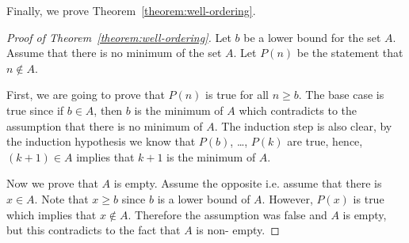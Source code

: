 Finally, we prove Theorem~\ref{theorem:well-ordering}.
\begin{proof}[Proof of Theorem~\ref{theorem:well-ordering}]
  Let $b$ be a lower bound for the set $A$. Assume that there is no minimum of
  the set $A$. Let $P(n)$ be the statement that
  $n \notin A$.

  First, we are going to prove that $P(n)$ is true for all
  $n \ge b$. The base case is true since if $b \in A$, then $b$ is the minimum
  of $A$ which contradicts to the assumption that there is no minimum of $A$.
  The induction step is also clear, by the induction hypothesis we know that
  $P(b)$, \dots, $P(k)$ are true, hence, $(k + 1) \in A$ implies that $k + 1$
  is the minimum of $A$.

  Now we prove that $A$ is empty. Assume the opposite i.e. assume that there is
  $x \in A$. Note that $x \ge b$ since $b$ is a lower bound of $A$. However,
  $P(x)$ is true which implies that $x \notin A$. Therefore the assumption was
  false and $A$ is empty, but this contradicts to the fact that $A$ is non-
  empty.
\end{proof}


